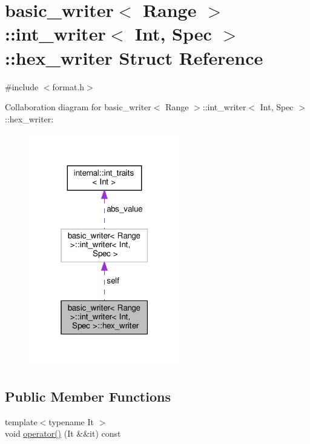 \hypertarget{structbasic__writer_1_1int__writer_1_1hex__writer}{}\section{basic\+\_\+writer$<$ Range $>$\+:\+:int\+\_\+writer$<$ Int, Spec $>$\+:\+:hex\+\_\+writer Struct Reference}
\label{structbasic__writer_1_1int__writer_1_1hex__writer}


{\ttfamily \#include $<$format.\+h$>$}



Collaboration diagram for basic\+\_\+writer$<$ Range $>$\+:\+:int\+\_\+writer$<$ Int, Spec $>$\+:\+:hex\+\_\+writer\+:
\nopagebreak
\begin{figure}[H]
\begin{center}
\leavevmode
\includegraphics[width=187pt]{structbasic__writer_1_1int__writer_1_1hex__writer__coll__graph}
\end{center}
\end{figure}
\subsection*{Public Member Functions}
\begin{DoxyCompactItemize}
\item 
{\footnotesize template$<$typename It $>$ }\\void \hyperlink{structbasic__writer_1_1int__writer_1_1hex__writer_a1a9f7eba393b50830d2bf9cfa092d2f9}{operator()} (It \&\&it) const
\end{DoxyCompactItemize}
